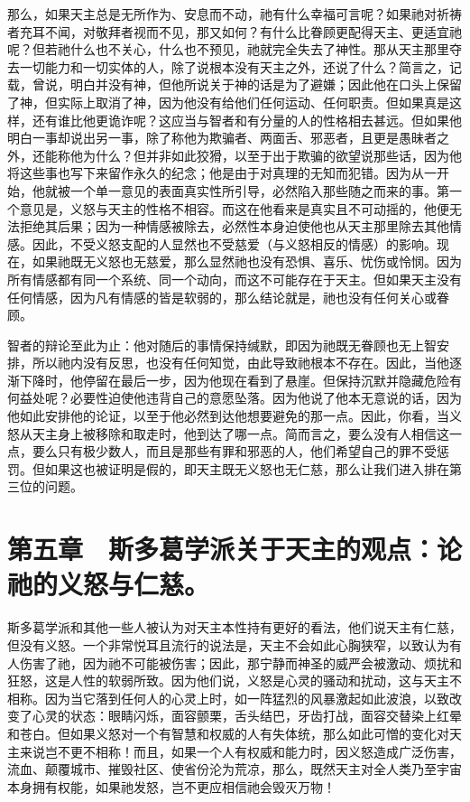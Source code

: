那么，如果天主总是无所作为、安息而不动，祂有什么幸福可言呢？如果祂对祈祷者充耳不闻，对敬拜者视而不见，那又如何？有什么比眷顾更配得天主、更适宜祂呢？但若祂什么也不关心，什么也不预见，祂就完全失去了神性。那从天主那里夺去一切能力和一切实体的人，除了说根本没有天主之外，还说了什么？简言之，记载，曾说，明白并没有神，但他所说关于神的话是为了避嫌；因此他在口头上保留了神，但实际上取消了神，因为他没有给他们任何运动、任何职责。但如果真是这样，还有谁比他更诡诈呢？这应当与智者和有分量的人的性格相去甚远。但如果他明白一事却说出另一事，除了称他为欺骗者、两面舌、邪恶者，且更是愚昧者之外，还能称他为什么？但并非如此狡猾，以至于出于欺骗的欲望说那些话，因为他将这些事也写下来留作永久的纪念；他是由于对真理的无知而犯错。因为从一开始，他就被一个单一意见的表面真实性所引导，必然陷入那些随之而来的事。第一个意见是，义怒与天主的性格不相容。而这在他看来是真实且不可动摇的，他便无法拒绝其后果；因为一种情感被除去，必然性本身迫使他也从天主那里除去其他情感。因此，不受义怒支配的人显然也不受慈爱（与义怒相反的情感）的影响。现在，如果祂既无义怒也无慈爱，那么显然祂也没有恐惧、喜乐、忧伤或怜悯。因为所有情感都有同一个系统、同一个动向，而这不可能存在于天主。但如果天主没有任何情感，因为凡有情感的皆是软弱的，那么结论就是，祂也没有任何关心或眷顾。\par

智者的辩论至此为止：他对随后的事情保持缄默，即因为祂既无眷顾也无上智安排，所以祂内没有反思，也没有任何知觉，由此导致祂根本不存在。因此，当他逐渐下降时，他停留在最后一步，因为他现在看到了悬崖。但保持沉默并隐藏危险有何益处呢？必要性迫使他违背自己的意愿坠落。因为他说了他本无意说的话，因为他如此安排他的论证，以至于他必然到达他想要避免的那一点。因此，你看，当义怒从天主身上被移除和取走时，他到达了哪一点。简而言之，要么没有人相信这一点，要么只有极少数人，而且是那些有罪和邪恶的人，他们希望自己的罪不受惩罚。但如果这也被证明是假的，即天主既无义怒也无仁慈，那么让我们进入排在第三位的问题。\par


\section{第五章　斯多葛学派关于天主的观点：论祂的义怒与仁慈。}

斯多葛学派和其他一些人被认为对天主本性持有更好的看法，他们说天主有仁慈，但没有义怒。一个非常悦耳且流行的说法是，天主不会如此心胸狭窄，以致认为有人伤害了祂，因为祂不可能被伤害；因此，那宁静而神圣的威严会被激动、烦扰和狂怒，这是人性的软弱所致。因为他们说，义怒是心灵的骚动和扰动，这与天主不相称。因为当它落到任何人的心灵上时，如一阵猛烈的风暴激起如此波浪，以致改变了心灵的状态：眼睛闪烁，面容颤栗，舌头结巴，牙齿打战，面容交替染上红晕和苍白。但如果义怒对一个有智慧和权威的人有失体统，那么如此可憎的变化对天主来说岂不更不相称！而且，如果一个人有权威和能力时，因义怒造成广泛伤害，流血、颠覆城市、摧毁社区、使省份沦为荒凉，那么，既然天主对全人类乃至宇宙本身拥有权能，如果祂发怒，岂不更应相信祂会毁灭万物！\par

